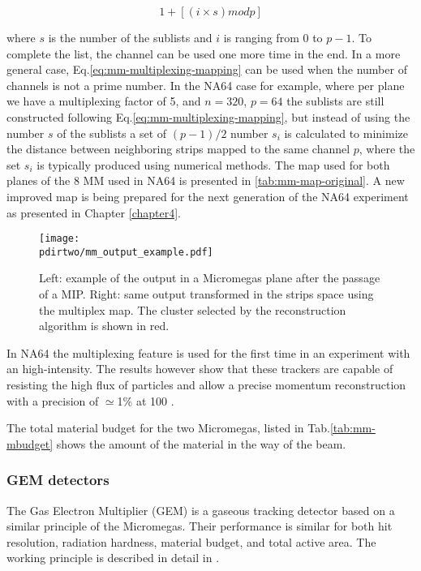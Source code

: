 \begin{equation}
\label{eq:mm-multiplexing-mapping}
1 + [(i \times s) mod p]
\end{equation}

where $s$ is the number of the sublists and $i$ is ranging from 0 to $p-1$. To complete the list, the channel can be used one more time in the end. In a more general case, Eq.\ref{eq:mm-multiplexing-mapping} can be used when the number of channels is not a prime number. In the NA64 case for example, where per plane we have a multiplexing factor of 5, and $n=320$, $p=64$ the sublists are still constructed following Eq.\ref{eq:mm-multiplexing-mapping}, but instead of using the number $s$ of the sublists a set of $(p-1)/2$ number $s_i$ is calculated to minimize the distance between neighboring strips mapped to the same channel $p$, where the set $s_i$ is typically produced using numerical methods. The map used for both planes of the 8 MM used in NA64 is presented in \ref{tab:mm-map-original}. A new improved map is being prepared for the next generation of the NA64 experiment as presented in Chapter \ref{chapter4}.

\begin{figure}[bth!]
  \centering
  \texttt{[image: \\pdirtwo/mm\_output\_example.pdf]}
\caption[example of the readout of a multiplexing detector]{Left: example of the output in a Micromegas plane after the passage of a MIP. Right: same output transformed in the strips space using the multiplex map. The cluster selected by the reconstruction algorithm is shown in red.}
\label{fig:multiplexing-example}
\end{figure}

In NA64 the multiplexing feature is used for the first time in an experiment with an high-intensity. The results however show that these trackers are capable of resisting the high flux of particles and allow a precise momentum reconstruction with a precision of $\simeq$1\% at 100 \si{\gev} \cite{Banerjee:2017mdu}.

The total material budget for the two Micromegas, listed in Tab.\ref{tab:mm-mbudget} shows the amount of the material in the way of the beam.

\subsubsection{GEM detectors}
\label{ch2:sec:gem}
The Gas Electron Multiplier (GEM) is a gaseous tracking detector based on a similar principle of the Micromegas. Their performance is similar for both hit resolution, radiation hardness, material budget, and total active area. The working principle is described in detail in \cite{gem,SAULI20162,ABBON2007455}.

